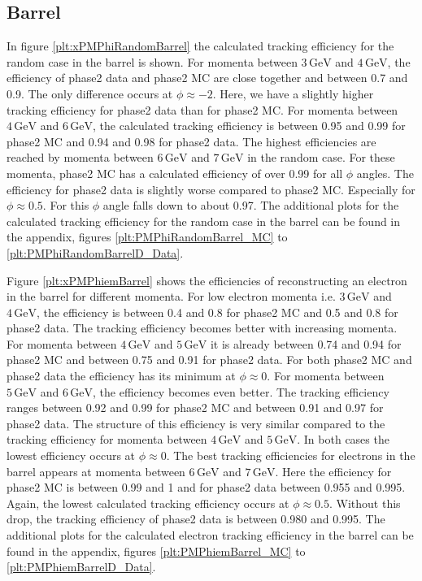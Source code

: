 \documentclass[a4paper,11pt,twosided,final,german,openbib,pdftex,listof=totoc,bibliography=totoc]{scrbook}
\begin{document}
\newpage



\subsection{Barrel}

In figure \ref{plt:xPMPhiRandomBarrel} the calculated tracking efficiency for the random case in the barrel is shown. For momenta between $3\,\textrm{GeV}$ and $4\,\textrm{GeV}$, the efficiency of phase2 data and phase2 MC are close together and between 0.7 and 0.9. The only difference occurs at $\phi \approx -2$. Here, we have a slightly higher tracking efficiency for phase2 data than for phase2 MC.
For momenta between $4\,\textrm{GeV}$ and $6\,\textrm{GeV}$, the calculated tracking efficiency is between 0.95 and 0.99 for phase2 MC and 0.94 and 0.98 for phase2 data. The highest efficiencies are reached by momenta between $6\,\textrm{GeV}$ and $7\,\textrm{GeV}$ in the random case. For these momenta, phase2 MC has a calculated efficiency of over 0.99 for all $\phi$ angles. The efficiency for phase2 data is slightly worse compared to phase2 MC. Especially for $\phi \approx 0.5$. For this $\phi$ angle falls down to about 0.97. The additional plots for the calculated tracking efficiency for the random case in the barrel can be found in the appendix, figures \ref{plt:PMPhiRandomBarrel_MC} to \ref{plt:PMPhiRandomBarrelD_Data}.

Figure \ref{plt:xPMPhiemBarrel} shows the efficiencies of reconstructing an electron in the barrel for different momenta. For low electron momenta i.e. $3\,\textrm{GeV}$ and $4\,\textrm{GeV}$, the efficiency is between 0.4 and 0.8 for phase2 MC and 0.5 and 0.8 for phase2 data. The tracking efficiency becomes better with increasing momenta. For momenta between $4\,\textrm{GeV}$ and $5\,\textrm{GeV}$ it is already between 0.74 and 0.94 for phase2 MC and between 0.75 and 0.91 for phase2 data. For both phase2 MC and phase2 data the efficiency has its minimum at $\phi \approx 0$. For momenta between $5\,\textrm{GeV}$ and $6\,\textrm{GeV}$, the efficiency becomes even better. The tracking efficiency ranges between 0.92 and 0.99 for phase2 MC and between 0.91 and 0.97 for phase2 data. The structure of this efficiency is very similar compared to the tracking efficiency for momenta between $4\,\textrm{GeV}$ and $5\,\textrm{GeV}$. In both cases the lowest efficiency occurs at $\phi \approx 0$. The best tracking efficiencies for electrons in the barrel appears at momenta between $6\,\textrm{GeV}$ and $7\,\textrm{GeV}$. Here the efficiency for phase2 MC is between 0.99 and 1 and for phase2 data between 0.955 and 0.995. Again, the lowest calculated tracking efficiency occurs at  $\phi \approx 0.5$. Without this drop, the tracking efficiency of phase2 data is between 0.980 and 0.995. The additional plots for the calculated electron tracking efficiency in the barrel can be found in the appendix, figures \ref{plt:PMPhiemBarrel_MC} to \ref{plt:PMPhiemBarrelD_Data}.
\end{document}
